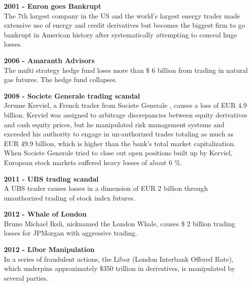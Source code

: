 	\textbf{2001 - Enron goes Bankrupt}\\
		The 7th largest company in the US and the world's largest energy trader made extensive use of energy 
		and credit derivatives but becomes the biggest firm to go bankrupt in American history after systematically 
		attempting to conceal huge losses.

	\textbf{2006 - Amaranth Advisors}\\
		The multi strategy hedge fund loses more than $\$$ 6 billion from trading in natural gas futures. The hedge fund collapses.

	\textbf{2008 - Societe Generale trading scandal}\\
		Jerume Kerviel, a French trader from Societe Generale , causes a loss of EUR 4.9 billion. Kerviel was assigned to 
		arbitrage discrepancies between equity derivatives and cash equity prices, but he manipulated risk management 
		systems and exceeded his authority to engage in un-authorized trades totaling as much as EUR 49.9 billion, 
		which is higher than the bank's total market capitalization. When Societe Generale  tried to close out open 
		positions built up by Kerviel, European stock markets suffered heavy losses of about 6 $\%$.

	\textbf{2011 - UBS trading scandal}\\
		A UBS trader causes losses in a dimension of EUR 2 billion through unauthorized trading of stock index futures.

	\textbf{2012 - Whale of London}\\
		Bruno Michael Iksli, nicknamed the London Whale, causes $\$$ 2 billion trading losses for JPMorgan with aggressive trading.

	\textbf{2012 - Libor Manipulation}\\
		In a series of fraudulent actions, the Libor (London Interbank Offered Rate), which underpins approximately $\$$350 trillion in derivatives, is manipulated by several parties.


